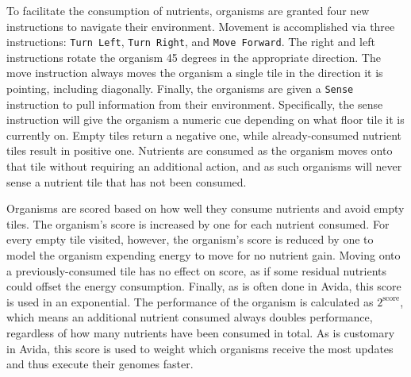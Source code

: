 To facilitate the consumption of nutrients, organisms are granted four new instructions to navigate their environment. 
Movement is accomplished via three instructions: \texttt{Turn Left}, \texttt{Turn Right}, and \texttt{Move Forward}. 
The right and left instructions rotate the organism 45 degrees in the appropriate direction. 
The move instruction always moves the organism a single tile in the direction it is pointing, including diagonally. 
Finally, the organisms are given a \texttt{Sense} instruction to pull information from their environment. 
Specifically, the sense instruction will give the organism a numeric cue depending on what floor tile it is currently on. 
Empty tiles return a negative one, while already-consumed nutrient tiles result in positive one. 
Nutrients are consumed as the organism moves onto that tile without requiring an additional action, and as such organisms will never sense a nutrient tile that has not been consumed.  

Organisms are scored based on how well they consume nutrients and avoid empty tiles. 
The organism's score is increased by one for each nutrient consumed. 
For every empty tile visited, however, the organism's score is reduced by one to model the organism expending energy to move for no nutrient gain. 
Moving onto a previously-consumed tile has no effect on score, as if some residual nutrients could offset the energy consumption. 
Finally, as is often done in Avida, this score is used in an exponential. 
The performance of the organism is calculated as $2^{\text{score}}$, which means an additional nutrient consumed always doubles performance, regardless of how many nutrients have been consumed in total. 
As is customary in Avida, this score is used to weight which organisms receive the most updates and thus execute their genomes faster. 

